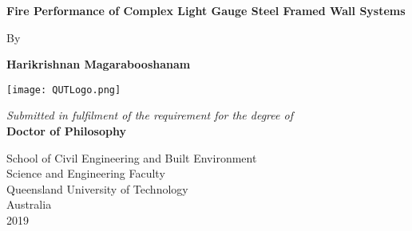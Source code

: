 \begin{titlepage}
    \begin{center}
        \vspace*{1cm}
        \Huge
        \textbf{Fire Performance of Complex Light Gauge Steel Framed Wall Systems}
        
        \vspace{1cm}
        \Large
        By
        
        \vspace{1cm}
        \LARGE
        \textbf{Harikrishnan Magarabooshanam}
        \vspace{1.5cm}
        
        \texttt{[image: QUTLogo.png]}
        
        \vspace{1cm}
        \Large
        \textit{Submitted in fulfilment of the requirement for the degree of}\\
        \vspace{1cm}
        \LARGE
       \textbf{ Doctor of Philosophy}
        \vspace{1cm}
        
      \linespread{1.5}
      \large    
        School of Civil Engineering and Built Environment\\   
        Science and Engineering Faculty\\     
        Queensland University of Technology\\        
        Australia\\
        
        2019 
    \end{center}
\end{titlepage}